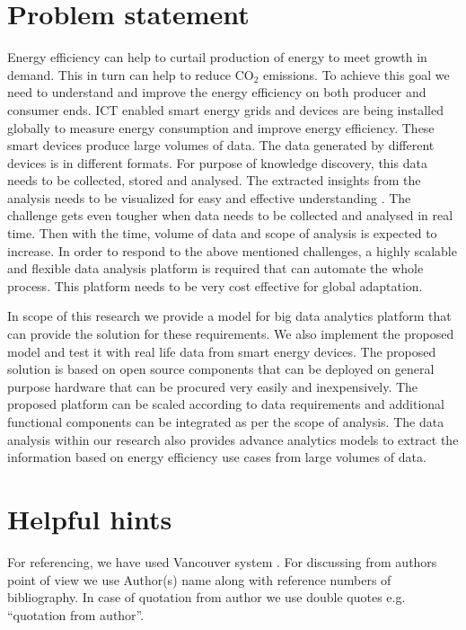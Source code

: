 \section{Problem statement}

Energy efficiency can help to curtail production of energy to meet growth in demand. This in turn can help to reduce CO\(_{2}\) emissions. To achieve this goal we need to understand and improve the energy efficiency on both producer and consumer ends. ICT enabled smart energy grids and devices are being installed globally to measure energy consumption and improve energy efficiency. These smart devices produce large volumes of data. The data generated by different devices is in different formats. For purpose of knowledge discovery, this data needs to be collected, stored and analysed. The extracted insights from the analysis needs to be visualized for easy and effective understanding . The challenge gets even tougher when data needs to be collected and analysed in real time. Then with the time, volume of data and scope of analysis is expected to increase. In order to respond to the above mentioned challenges, a highly scalable and flexible data analysis platform is required that can automate the whole process. This platform needs to be very cost effective for global adaptation.
 
In scope of this research we provide a model for big data analytics platform that can provide the solution for these requirements. We also implement the proposed model and test it with real life data from smart energy devices. The proposed solution is based on open source components that can be deployed on general purpose hardware that can be procured very easily and inexpensively. The proposed platform can be scaled according to data requirements and additional functional components can be integrated as per the scope of analysis. The data analysis within our research also provides advance analytics models to extract the information based on energy efficiency use cases from large volumes of data.


\section{Helpful hints}

For referencing, we have used Vancouver system \cite{neville2012referencing}. For discussing from authors point of view we use Author(s) name along with reference numbers of bibliography. In case of quotation from author we use double quotes e.g. ``quotation from author''.

